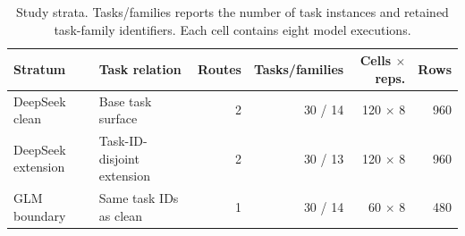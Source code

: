 
\begin{table}[H]
\centering
\caption{Study strata. Tasks/families reports the number of task instances and retained task-family identifiers. Each cell contains eight model executions.}
\label{tab:strata}
\small
\begin{tabularx}{\linewidth}{@{}lXrrrr@{}}
\toprule
Stratum & Task relation & Routes & Tasks/families & Cells $\times$ reps. & Rows \\
\midrule
DeepSeek clean & Base task surface & 2 & 30 / 14 & 120 $\times$ 8 & 960 \\
DeepSeek extension & Task-ID-disjoint extension & 2 & 30 / 13 & 120 $\times$ 8 & 960 \\
GLM boundary & Same task IDs as clean & 1 & 30 / 14 & 60 $\times$ 8 & 480 \\
\bottomrule
\end{tabularx}
\end{table}
